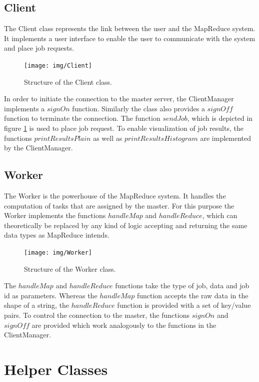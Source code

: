 \documentclass[12pt, letterpaper]{article}
\begin{document}
\subsection{Client}

The Client class represents the link between the user and the MapReduce system. It implements a user interface to enable the user to communicate with the system and place job requests. 

\begin{figure}[h]
	\centering
	\texttt{[image: img/Client]}
	\caption{Structure of the Client class.}
	\label{fig:classes_Client}
\end{figure}

In order to initiate the connection to the master server, the ClientManager implements a $signOn$ function. Similarly the class also provides a $signOff$ function to terminate the connection. The function $sendJob$, which is depicted in figure \ref{fig:classes_Client} is used to place job request. To enable visualization of job results, the functions $printResultsPlain$ as well as $printResultsHistogram$ are implemented by the ClientManager.

\subsection{Worker}

The Worker is the powerhouse of the MapReduce system. It handles the computation of tasks that are assigned by the master. For this purpose the Worker implements the functions $handleMap$ and $handleReduce$, which can theoretically be replaced by any kind of logic accepting and returning the same data types as MapReduce intends. 

\begin{figure}[h]
 	\centering
 	\texttt{[image: img/Worker]}
 	\caption{Structure of the Worker class.}
 	\label{fig:classes_Worker}
\end{figure}

The $handleMap$ and $handleReduce$ functions take the type of job, data and job id as parameters. Whereas the $handleMap$ function accepts the raw data in the shape of a string, the $handleReduce$ function is provided with a set of key/value pairs.\newline
To control the connection to the master, the functions $signOn$ and $signOff$ are provided which work analogously to the functions in the ClientManager.

\section{Helper Classes}
\end{document}
